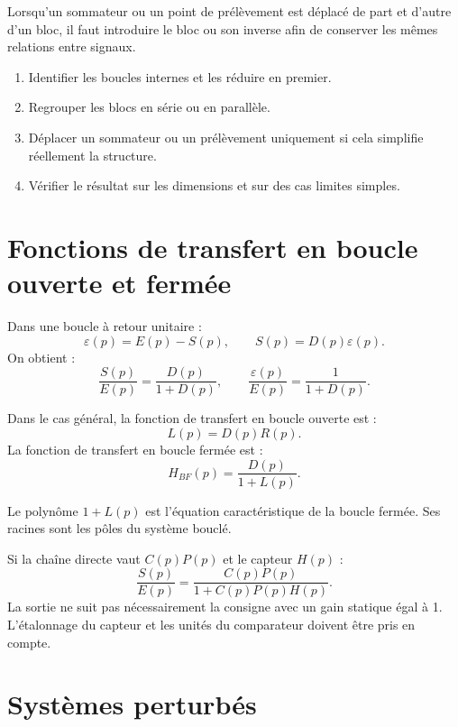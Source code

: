 Lorsqu'un sommateur ou un point de prélèvement est déplacé de part et d'autre d'un bloc, il faut introduire le bloc ou son inverse afin de conserver les mêmes relations entre signaux.

\begin{SAmethode}[title={Simplifier un schéma-blocs}]
\begin{enumerate}
  \item Identifier les boucles internes et les réduire en premier.
  \item Regrouper les blocs en série ou en parallèle.
  \item Déplacer un sommateur ou un prélèvement uniquement si cela simplifie réellement la structure.
  \item Vérifier le résultat sur les dimensions et sur des cas limites simples.
\end{enumerate}
\end{SAmethode}

\section{Fonctions de transfert en boucle ouverte et fermée}\label{sec:sa-ftbo-ftbf}

Dans une boucle à retour unitaire :
\[
\varepsilon(p)=E(p)-S(p),\qquad S(p)=D(p)\varepsilon(p).
\]
On obtient :
\[
\frac{S(p)}{E(p)}=\frac{D(p)}{1+D(p)},
\qquad
\frac{\varepsilon(p)}{E(p)}=\frac{1}{1+D(p)}.
\]

Dans le cas général, la fonction de transfert en boucle ouverte est :
\[
L(p)=D(p)R(p).
\]
La fonction de transfert en boucle fermée est :
\[
H_{BF}(p)=\frac{D(p)}{1+L(p)}.
\]

Le polynôme $1+L(p)$ est l'équation caractéristique de la boucle fermée. Ses racines sont les pôles du système bouclé.

\begin{SAapplication}[title={Capteur non unitaire}]
Si la chaîne directe vaut $C(p)P(p)$ et le capteur $H(p)$ :
\[
\frac{S(p)}{E(p)}=\frac{C(p)P(p)}{1+C(p)P(p)H(p)}.
\]
La sortie ne suit pas nécessairement la consigne avec un gain statique égal à 1. L'étalonnage du capteur et les unités du comparateur doivent être pris en compte.
\end{SAapplication}

\section{Systèmes perturbés}\label{sec:sa-perturbations}

